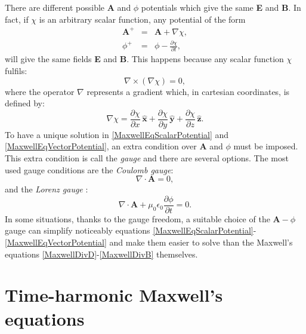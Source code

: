 There are different possible \textbf{A} and $\phi$ potentials which give the same \textbf{E} and \textbf{B}. In fact, if $\chi$ is an arbitrary scalar function, any potential of the form
\begin{eqnarray} 
	\mathbf{A}^{+} &=& \mathbf{A} + \nabla\chi, \label{PossibleA}
	\\
	\phi^{+} &=& \phi - \frac{\partial\chi}{\partial t},\label{PossibleScalar}
\end{eqnarray}
will give the same fields \textbf{E} and \textbf{B}. This happens because any scalar function $\chi$ fulfils: 
\begin{equation}\label{CurlGrad}
    \nabla\times\left(\nabla\chi\right) = 0,
\end{equation}
where the operator $\nabla$ represents a gradient which, in cartesian coordinates, is defined by:
\begin{equation}\label{LaplaceOperatorScalar}
    \nabla\chi = \frac{\partial\chi}{\partial x}\,\mathbf{\hat{x}}  + \frac{\partial\chi}{\partial y}\,\mathbf{\hat{y}}  + \frac{\partial\chi}{\partial z}\,\mathbf{\hat{z}}.
\end{equation}
To have a unique solution in \eqref{MaxwellEqScalarPotential} and \eqref{MaxwellEqVectorPotential}, an extra condition over \textbf{A} and $\phi$ must be imposed. This extra condition is call the \emph{gauge} and there are several options. The most used gauge conditions are the \emph{Coulomb gauge}:
\begin{equation}\label{CoulombGauge}
    \nabla\cdot\mathbf{A} = 0,
\end{equation}
and the \emph{Lorenz gauge} \cite{LorenzLorentz, LorenzLorentz2}:
\begin{equation}\label{LorentzGauge}
    \nabla\cdot\mathbf{A} + \mu_{0}\epsilon_{0}\frac{\partial\phi}{\partial t} = 0.
\end{equation}
In some situations, thanks to the gauge freedom, a suitable choice of the $\textbf{A}-\phi$ gauge can simplify noticeably equations \eqref{MaxwellEqScalarPotential}-\eqref{MaxwellEqVectorPotential} and make them easier to solve than the Maxwell's equations \eqref{MaxwellDivD}-\eqref{MaxwellDivB} themselves.

\section{Time-harmonic Maxwell's equations}\label{sEMTH}

